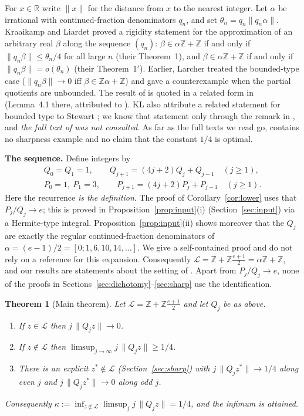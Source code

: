 \documentclass[11pt]{amsart}
\newtheorem{theorem}{Theorem}
\theoremstyle{remark}
\newcommand{\Z}{\mathbb{Z}}
\newcommand{\R}{\mathbb{R}}
\newcommand{\dist}[1]{\lVert #1\rVert}
\newcommand{\LL}{\mathcal{L}}
\begin{document}
For $x\in\R$ write $\dist{x}$ for the distance from $x$ to the nearest integer. Let $\alpha$
be irrational with continued-fraction denominators $q_n$, and set
$\theta_n=q_n\dist{q_n\alpha}$. Kraaikamp and Liardet \cite{KL} proved a rigidity
statement for the approximation of an arbitrary real $\beta$ along the sequence $(q_n)$:
$\beta\in\alpha\Z+\Z$ if and only if $\dist{q_n\beta}\le\theta_n/4$ for all large $n$
(their Theorem~1), and $\beta\in\alpha\Z+\Z$ if and only if $\dist{q_n\beta}=o(\theta_n)$
(their Theorem~1$'$). Earlier, Larcher \cite{Larcher} treated the bounded-type case
($\dist{q_n\beta}\to0$ iff $\beta\in\Z\alpha+\Z$) and gave a counterexample when the partial
quotients are unbounded. The result of \cite{KL} is quoted in a related form in \cite{BDS}
(Lemma~4.1 there, attributed to \cite{KL}). KL also attribute a related statement for bounded type to
Stewart \cite{Stewart}; we know that statement only through the remark in \cite{KL}, and
\emph{the full text of \cite{Stewart} was not consulted}.
As far as the full texts we read go, \cite{KL} contains no sharpness example and no claim
that the constant $1/4$ is optimal.

\medskip
\noindent\textbf{The sequence.} Define integers by
\begin{gather*}
Q_0=Q_1=1,\qquad Q_{j+1}=(4j+2)Q_j+Q_{j-1}\quad(j\ge1),\\
P_0=1,\ P_1=3,\qquad P_{j+1}=(4j+2)P_j+P_{j-1}\quad(j\ge1).
\end{gather*}
Here the recurrence \emph{is the definition}. The proof of Corollary~\ref{cor:lower} uses that
$P_j/Q_j\to e$; this is proved in Proposition~\ref{prop:input}(i) (Section~\ref{sec:input}) via a
Hermite-type integral. Proposition~\ref{prop:input}(ii) shows moreover that the $Q_j$ are exactly the
regular continued-fraction denominators of $\alpha=(e-1)/2=[0;1,6,10,14,\dots]$. We give a
self-contained proof and do not rely on a reference for this expansion.
Consequently $\LL=\Z+\Z\frac{e+1}{2}=\alpha\Z+\Z$, and our results are statements about the
setting of \cite{KL}. Apart from $P_j/Q_j\to e$, none of the proofs in
Sections~\ref{sec:dichotomy}--\ref{sec:sharp} use the identification.

\begin{theorem}[Main theorem]\label{thm:main}
Let $\LL=\Z+\Z\frac{e+1}{2}$ and let $Q_j$ be as above.
\begin{enumerate}
\item[(a)] If $z\in\LL$ then $j\,\dist{Q_jz}\to0$.
\item[(b)] If $z\notin\LL$ then $\limsup_{j\to\infty} j\,\dist{Q_jz}\ge 1/4$.
\item[(c)] There is an explicit $z^*\notin\LL$ (Section~\ref{sec:sharp}) with
$j\,\dist{Q_jz^*}\to 1/4$ along even $j$ and $j\,\dist{Q_jz^*}\to0$ along odd $j$.
\end{enumerate}
Consequently $\kappa:=\inf_{z\notin\LL}\limsup_j j\,\dist{Q_jz}=1/4$, and the infimum is attained.
\end{theorem}
\end{document}
